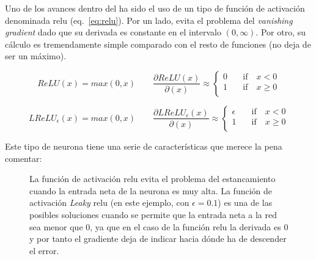 Uno de los avances dentro del  ha sido el uso de un tipo de función de activación denominada \Acrfull{relu} (eq.~\ref{eq:relu}). Por un lado, evita el problema del \textit{vanishing gradient} dado que su derivada es constante en el intervalo $(0, \infty)$. Por otro, su cálculo es tremendamente simple comparado con el resto de funciones (no deja de ser un máximo).

\begin{equation}
	ReLU(x) = max(0, x) \qquad
	\frac{\partial ReLU(x)}{\partial(x)} \approx
	\begin{cases}
	0 &\quad\text{if}\quad x < 0 \\
	1 &\quad\text{if}\quad x \geq 0 \\
	\end{cases}
	\label{eq:relu}
\end{equation}

\begin{equation}
	LReLU_\epsilon(x) = max(0, x) \qquad
	\frac{\partial LReLU_\epsilon(x)}{\partial(x)} \approx
	\begin{cases}
	\epsilon &\quad\text{if}\quad x < 0 \\
	1 &\quad\text{if}\quad x \geq 0 \\
	\end{cases}
	\label{eq:leaky-relu}
\end{equation}

Este tipo de neurona tiene una serie de características que merece la pena comentar:

\begin{figure}[!b]
	\centering
	\qquad
	\caption[Funciones de activación: \acrshort{relu} y Leaky-\acrshort{relu}]{La función de activación \gls{relu} evita el problema del estancamiento cuando la entrada neta de la neurona es muy alta. La función de activación \textit{Leaky} \gls{relu} (en este ejemplo, con $\epsilon = 0.1$) es una de las posibles soluciones cuando se permite que la entrada neta a la red sea menor que $0$, ya que en el caso de la función \gls{relu} la derivada es $0$ y por tanto el gradiente deja de indicar hacia dónde ha de descender el error.}
	\label{fig:relu-and-leaky-relu}
\end{figure}

